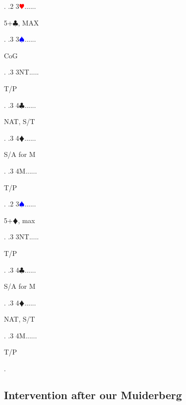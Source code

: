 \documentclass[a4paper]{article}
\newcommand{\BC}{\textcolor{OliveGreen}{$\clubsuit$}}
\newcommand{\BD}{\textcolor{RedOrange}{$\vardiamondsuit$}}
\newcommand{\BH}{\textcolor{Red}{$\varheartsuit${}}}
\newcommand{\BS}{\textcolor{Blue}{$\spadesuit${}}}
\begin{document}
{\begin{minipage}[t]{0.8\textwidth}
\end{minipage}. 
 .2 3\BH......\begin{minipage}[t]{0.8\textwidth}
5+\BC , MAX
\end{minipage}. 
 .3 3\BS......\begin{minipage}[t]{0.8\textwidth}
CoG
\end{minipage}. 
 .3 3NT.....\begin{minipage}[t]{0.8\textwidth}
T/P
\end{minipage}. 
 .3 4\BC......\begin{minipage}[t]{0.8\textwidth}
NAT, S/T
\end{minipage}. 
 .3 4\BD......\begin{minipage}[t]{0.8\textwidth}
S/A for M
\end{minipage}. 
 .3 4M......\begin{minipage}[t]{0.8\textwidth}
T/P
\end{minipage}. 
 .2 3\BS......\begin{minipage}[t]{0.8\textwidth}
5+\BD , max
\end{minipage}. 
 .3 3NT.....\begin{minipage}[t]{0.8\textwidth}
T/P
\end{minipage}. 
 .3 4\BC......\begin{minipage}[t]{0.8\textwidth}
S/A for M
\end{minipage}. 
 .3 4\BD......\begin{minipage}[t]{0.8\textwidth}
NAT, S/T
\end{minipage}. 
 .3 4M......\begin{minipage}[t]{0.8\textwidth}
T/P
\end{minipage}. 
}
\bigbreak
\subsection{Intervention after our Muiderberg}
\end{document}
